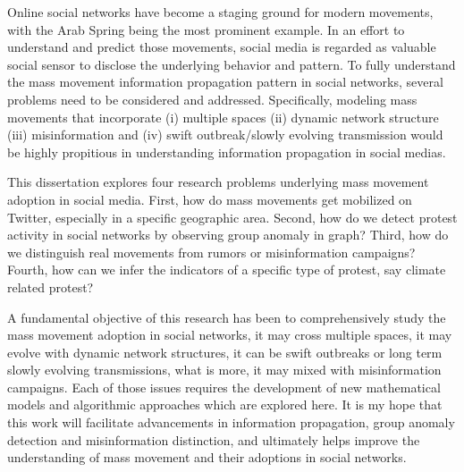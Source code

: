 \documentclass[12pt,dvips]{report}
\begin{document}
Online social networks have become a staging ground for modern movements, with the Arab
Spring being the most prominent example. In an effort to understand and predict those movements, social media is regarded as valuable social sensor to disclose the underlying behavior and pattern. To fully understand the mass movement information propagation pattern in social networks, several problems need to be considered and addressed. Specifically, modeling mass movements that incorporate (i) multiple spaces (ii) dynamic network structure (iii) misinformation and (iv) swift outbreak/slowly evolving transmission would be highly propitious in understanding information propagation in social medias.

This dissertation explores four research problems underlying mass movement adoption in social media. First, how do mass movements get mobilized on Twitter, especially in a specific geographic area. Second, how do we detect protest activity in social networks by observing group anomaly in graph?
Third, how do we distinguish real movements from rumors or misinformation campaigns? Fourth, how can we infer the indicators of a specific type of protest, say climate related protest?

A fundamental objective of this research has been to comprehensively study the mass movement adoption in social networks, it may cross multiple spaces, it may evolve with dynamic network structures, it can be swift outbreaks or long term slowly evolving transmissions, what is more, it may mixed with misinformation campaigns. Each of those issues requires the development of new mathematical models and algorithmic approaches which are explored here.  It is my hope that this work will facilitate advancements in information propagation, group anomaly detection and misinformation distinction, and ultimately helps improve the understanding of mass movement and their adoptions in social networks.

\end{document}
